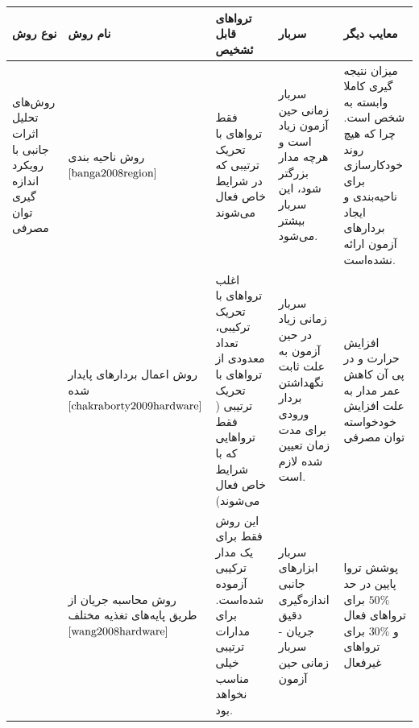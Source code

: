\begin{table}
	\begin{tabular}{|p{1cm}||p{3cm}|p{3cm}|p{3cm}|p{3cm}|}
		نوع روش & نام روش & تروا‌های قابل ئشخیص & سربار& معایب دیگر \\ \hline \hline
		روش‌ها‌‌ی تحلیل اثرات جانبی با رویکرد اندازه ‌گیری توان مصرفی&روش ناحیه بندی $\cite{banga2008region}$ &فقط تروا‌های با تحریک ترتیبی که در شرایط خاص فعال می‌شوند &سربار زمانی حین آزمون زیاد است و هرچه مدار بزرگتر شود، این سربار بیشتر می‌شود. &میزان نتیجه گیری کاملا وابسته به شخص است. چرا که هیچ روند خودکار‌‌سازی برای ناحیه‌‌بندی و ایجاد بردارهای آزمون ارائه نشده‌است. 
		
		
		\\ \cline{2-5}
		&روش اعمال بردارهای پایدار شده $\cite{chakraborty2009hardware}$ &اغلب تروا‌های با تحریک ترکیبی، تعداد معدودی از تروا‌های با تحریک ترتیبی ( فقط تروا‌هایی که با شرایط خاص فعال می‌شوند) &سربار زمانی زیاد در حین آزمون به علت ثابت نگهداشتن بردار ورودی برای مدت زمان تعیین شده لازم ‌است. &افزایش حرارت و در پی آن کاهش عمر مدار به علت افزایش خودخواسته توان مصرفی
		\\ \cline{2-5}
		& روش محاسبه جریان از طریق پایه‌‌های تغذیه مختلف $\cite{wang2008hardware}$ &این روش فقط برای یک مدار ترکیبی آزموده شده‌است. برای مدارات ترتیبی خیلی مناسب نخواهد بود. & سربار ابزارهای جانبی اندازه‌گیری دقیق جریان - سربار زمانی حین آزمون&پوشش تروا پایین در حد $50\%$ برای تروا‌های فعال و $ 30\%$ برای تروا‌های غیرفعال 
	\end{tabular}
\end{table}
\newpage

